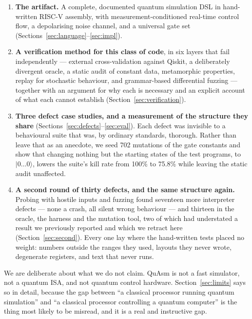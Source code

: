 \documentclass[11pt]{article}
\newcommand{\quasm}{QuAsm}
\newcommand{\ket}[1]{\ensuremath{|#1\rangle}}
\begin{document}
\begin{enumerate}
  \item \textbf{The artifact.} A complete, documented quantum simulation DSL in hand-written
    RISC-V assembly, with measurement-conditioned real-time control flow, a depolarising
    noise channel, and a universal gate set (Sections~\ref{sec:language}--\ref{sec:impl}).
  \item \textbf{A verification method for this class of code}, in six layers that fail
    independently --- external cross-validation against Qiskit, a deliberately divergent
    oracle, a static audit of constant data, metamorphic properties, replay for
    stochastic behaviour, and grammar-based differential fuzzing --- together with an
    argument for why each is necessary and an explicit account of what each cannot
    establish (Section~\ref{sec:verification}).
  \item \textbf{Three defect case studies, and a measurement of the structure they
    share} (Sections~\ref{sec:defects}--\ref{sec:eval}). Each defect was invisible to a
    behavioural suite that was, by ordinary standards, thorough. Rather than leave that as
    an anecdote, we seed 702 mutations of the gate constants and show that
    changing nothing but the starting states of the test programs, to \ket{0\ldots0},
    lowers the suite's kill rate from 100\% to 75.8\% while leaving the static
    audit unaffected.
  \item \textbf{A second round of thirty defects, and the same structure again.} Probing
    with hostile inputs and fuzzing found seventeen more interpreter defects --- none a
    crash, all silent wrong behaviour --- and thirteen in the oracle, the harness and the
    mutation tool, two of which had understated a result we previously reported and which
    we retract here (Section~\ref{sec:second}). Every one lay where the hand-written tests
    placed no weight: numbers outside the ranges they used, layouts they never wrote,
    degenerate registers, and text that never runs.
\end{enumerate}

We are deliberate about what we do not claim. \quasm{} is not a fast simulator, not a
quantum ISA, and not quantum control hardware. Section~\ref{sec:limits} says so in detail,
because the gap between ``a classical processor running quantum simulation'' and ``a
classical processor controlling a quantum computer'' is the thing most likely to be
misread, and it is a real and instructive gap.
\end{document}
